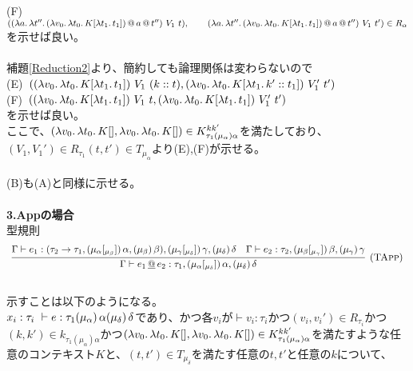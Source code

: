 \documentclass[japanese,draft]{jssst_ppl} %
\begin{document}
  (F)\ $(\LamP{a}{\Lam{t''}{\App{\App{\LamP{v_0}{\Lam{t_0}{K[\Lam{t_1}{t_1}]}}}{a}}{t''}}}\ V_1\ t),\\
  \qquad \LamP{a}{\Lam{t''}{\App{\App{\LamP{v_0}{\Lam{t_0}{K[\Lam{t_1}{t_1}]}}}{a}}{t''}}}\ V_1\ t')\in R_{\alpha}$\\
  を示せば良い。\\
  \\
  補題\ref{Reduction2}より、簡約しても論理関係は変わらないので\\
  (E)\ $(\LamP{v_0}{\Lam{t_0}{K[\Lam{t_1}{t_1}]}}\ V_1\ (\Cons{k}{t}), \LamP{v_0}{\Lam{t_0}{K[\Lam{t_1}{\Cons{k'}{t_1}}]}}\ V_1'\ t')$\\
  (F)\ $((\lambda{v_0}.\,{\lambda{t_0}.\,{K[\lambda{t_1}.\,{t_1}]}})\ V_1\ t, (\lambda{v_0}.\,{\lambda{t_0}.\,{K[\lambda{t_1}.\,{t_1}]}})\ V_1'\ t')$\\
  を示せば良い。\\
  ここで、$(\lambda{v_0}.\,{\lambda{t_0}.\,{K[]}}, \lambda{v_0}.\,{\lambda{t_0}.\,{K[]}})\in  K^{kk'}_{\tau_1(\mu_{\alpha})\alpha}$を満たしており、\\
  $(V_1, V_1')\in R_{\tau_1} (t,t')\in T_{\mu_{\alpha}}$より(E),(F)が示せる。\\
  \\
  (B)も(A)と同様に示せる。
\\
\\  
\textbf{3.Appの場合}\\
型規則  
\[
\begin{array}{c}
  \infer[\TApp]
      {\JudgeTrail{\Gamma}{\DApp{e_1}{e_2}}
                  {\tau_1}{\TrailsType{\alpha}{\delta}}{\TrailType{\delta}}}
      {\JudgeTrail{\Gamma}{e_1}
                  {\ArrowTrailP{\tau_2}{\tau_1}{\TrailsType{\alpha}{\beta}}
                                               {\TrailType{\beta}}}
                  {\TrailsType{\gamma}{\delta}}
                  {\TrailType{\delta}}
      &\JudgeTrail{\Gamma}{e_2}{\tau_2}{\TrailsType{\beta}{\gamma}}{\TrailType{\gamma}}}
\end{array}
\]
\\
示すことは以下のようになる。\\
$x_i:\tau_i\ \vdash e:\tau_1 (\mu_{\alpha})\,\alpha (\mu_{\delta})\,\delta$であり、かつ各$v_i$が$\vdash v_i:\tau_i$かつ$(v_i,v_i') \in R_{\tau_i}$かつ\\
$(k,k')\in k_{\tau_1(\mu_{\alpha})\alpha}$かつ$(\lambda{v_0}.\,{\lambda{t_0}.\,{K[]}}, \lambda{v_0}.\,{\lambda{t_0}.\,{K[]}})\in  K^{kk'}_{\tau_1(\mu_{\alpha})\alpha}$を満たすような任意のコンテキスト$K$と、$(t, t') \in T_{\mu_{\delta}}$を満たす任意の$t, t'$と任意の$k$について、\\
\end{document}
